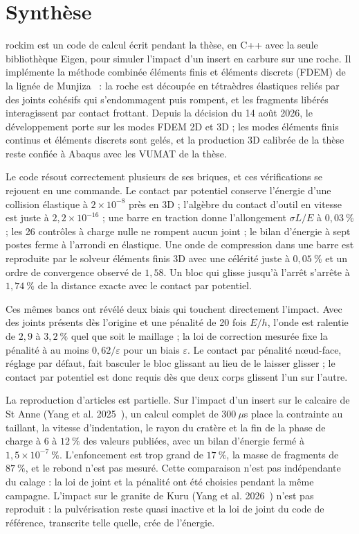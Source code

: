 \section*{Synthèse}

rockim est un code de calcul écrit pendant la thèse, en C++ avec la seule bibliothèque Eigen, pour simuler l'impact d'un insert en carbure sur une roche. Il implémente la méthode combinée éléments finis et éléments discrets (FDEM) de la lignée de Munjiza~\cite{munjiza2004fdem} : la roche est découpée en tétraèdres élastiques reliés par des joints cohésifs qui s'endommagent puis rompent, et les fragments libérés interagissent par contact frottant. Depuis la décision du 14 août 2026, le développement porte sur les modes FDEM 2D et 3D ; les modes éléments finis continus et éléments discrets sont gelés, et la production 3D calibrée de la thèse reste confiée à Abaqus avec les VUMAT de la thèse.

Le code résout correctement plusieurs de ses briques, et ces vérifications se rejouent en une commande. Le contact par potentiel conserve l'énergie d'une collision élastique à $2\times10^{-8}$ près en 3D ; l'algèbre du contact d'outil en vitesse est juste à $2{,}2\times10^{-16}$ ; une barre en traction donne l'allongement $\sigma L/E$ à $0{,}03~\%$ ; les 26 contrôles à charge nulle ne rompent aucun joint ; le bilan d'énergie à sept postes ferme à l'arrondi en élastique. Une onde de compression dans une barre est reproduite par le solveur éléments finis 3D avec une célérité juste à $0{,}05~\%$ et un ordre de convergence observé de $1{,}58$. Un bloc qui glisse jusqu'à l'arrêt s'arrête à $1{,}74~\%$ de la distance exacte avec le contact par potentiel.

Ces mêmes bancs ont révélé deux biais qui touchent directement l'impact. Avec des joints présents dès l'origine et une pénalité de 20 fois $E/h$, l'onde est ralentie de $2{,}9$ à $3{,}2~\%$ quel que soit le maillage ; la loi de correction mesurée fixe la pénalité à au moins $0{,}62/\varepsilon$ pour un biais $\varepsilon$. Le contact par pénalité nœud-face, réglage par défaut, fait basculer le bloc glissant au lieu de le laisser glisser ; le contact par potentiel est donc requis dès que deux corps glissent l'un sur l'autre.

La reproduction d'articles est partielle. Sur l'impact d'un insert sur le calcaire de St Anne (Yang et al. 2025~\cite{yang2025validation}), un calcul complet de $300~\mu$s place la contrainte au taillant, la vitesse d'indentation, le rayon du cratère et la fin de la phase de charge à 6 à $12~\%$ des valeurs publiées, avec un bilan d'énergie fermé à $1{,}5\times10^{-7}~\%$. L'enfoncement est trop grand de $17~\%$, la masse de fragments de $87~\%$, et le rebond n'est pas mesuré. Cette comparaison n'est pas indépendante du calage : la loi de joint et la pénalité ont été choisies pendant la même campagne. L'impact sur le granite de Kuru (Yang et al. 2026~\cite{yang2026pulverisation}) n'est pas reproduit : la pulvérisation reste quasi inactive et la loi de joint du code de référence, transcrite telle quelle, crée de l'énergie.

